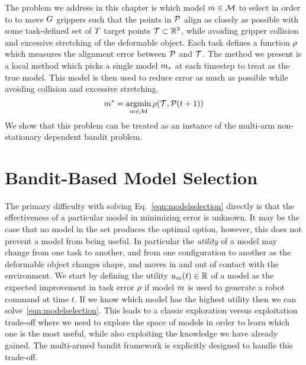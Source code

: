 The problem we address in this chapter is which model $m \in \mathcal{M}$ to select in order to to move $G$ grippers such that the points in $\mathcal{P}$ align as closely as possible with some task-defined set of $T$ target points $\mathcal{T} \subset \mathbb{R}^3$, while avoiding gripper collision and excessive stretching of the deformable object. Each task defines a function $\rho$ which measures the alignment error between $\mathcal{P}$ and $\mathcal{T}$. The method we present is a local method which picks a single model $m_{*}$ at each timestep to treat as the true model. This model is then used to reduce error as much as possible while avoiding collision and excessive stretching. 
\begin{equation}
    m^* = \operatorname*{argmin}_{m \in \mathcal{M}} \rho(\mathcal{T}, \mathcal{P}(t+1))
    \label{eqn:modelselection}
\end{equation}
We show that this problem can be treated as an instance of the multi-arm non-stationary dependent bandit problem.


\section{Bandit-Based Model Selection}

The primary difficulty with solving Eq.~\eqref{eqn:modelselection} directly is that the effectiveness of a particular model in minimizing error is unknown. It may be the case that no model in the set produces the optimal option, however, this does not prevent a model from being useful. In particular the \textit{utility} of a model may change from one task to another, and from one configuration to another as the deformable object changes shape, and moves in and out of contact with the environment. We start by defining the utility $u_m(t) \in \mathbb{R}$ of a model as the expected improvement in task error $\rho$ if model $m$ is used to generate a robot command at time $t$. If we know which model has the highest utility then we can solve~\eqref{eqn:modelselection}. This leads to a classic exploration versus exploitation trade-off where we need to explore the space of models in order to learn which one is the most useful, while also exploiting the knowledge we have already gained.  The multi-armed bandit framework is explicitly designed to handle this trade-off.

